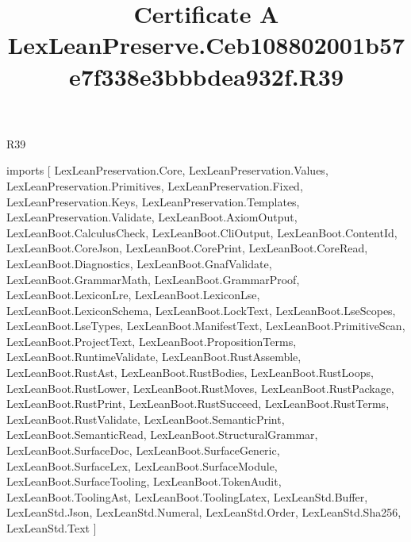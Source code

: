 \begin{lexlean}{R39}
\title{Certificate A LexLeanPreserve.Ceb108802001b57e7f338e3bbbdea932f.R39}
\begin{coremodule}
imports [
  LexLeanPreservation.Core,
  LexLeanPreservation.Values,
  LexLeanPreservation.Primitives,
  LexLeanPreservation.Fixed,
  LexLeanPreservation.Keys,
  LexLeanPreservation.Templates,
  LexLeanPreservation.Validate,
  LexLeanBoot.AxiomOutput,
  LexLeanBoot.CalculusCheck,
  LexLeanBoot.CliOutput,
  LexLeanBoot.ContentId,
  LexLeanBoot.CoreJson,
  LexLeanBoot.CorePrint,
  LexLeanBoot.CoreRead,
  LexLeanBoot.Diagnostics,
  LexLeanBoot.GnafValidate,
  LexLeanBoot.GrammarMath,
  LexLeanBoot.GrammarProof,
  LexLeanBoot.LexiconLre,
  LexLeanBoot.LexiconLse,
  LexLeanBoot.LexiconSchema,
  LexLeanBoot.LockText,
  LexLeanBoot.LseScopes,
  LexLeanBoot.LseTypes,
  LexLeanBoot.ManifestText,
  LexLeanBoot.PrimitiveScan,
  LexLeanBoot.ProjectText,
  LexLeanBoot.PropositionTerms,
  LexLeanBoot.RuntimeValidate,
  LexLeanBoot.RustAssemble,
  LexLeanBoot.RustAst,
  LexLeanBoot.RustBodies,
  LexLeanBoot.RustLoops,
  LexLeanBoot.RustLower,
  LexLeanBoot.RustMoves,
  LexLeanBoot.RustPackage,
  LexLeanBoot.RustPrint,
  LexLeanBoot.RustSucceed,
  LexLeanBoot.RustTerms,
  LexLeanBoot.RustValidate,
  LexLeanBoot.SemanticPrint,
  LexLeanBoot.SemanticRead,
  LexLeanBoot.StructuralGrammar,
  LexLeanBoot.SurfaceDoc,
  LexLeanBoot.SurfaceGeneric,
  LexLeanBoot.SurfaceLex,
  LexLeanBoot.SurfaceModule,
  LexLeanBoot.SurfaceTooling,
  LexLeanBoot.TokenAudit,
  LexLeanBoot.ToolingAst,
  LexLeanBoot.ToolingLatex,
  LexLeanStd.Buffer,
  LexLeanStd.Json,
  LexLeanStd.Numeral,
  LexLeanStd.Order,
  LexLeanStd.Sha256,
  LexLeanStd.Text
]


\end{coremodule}
\end{lexlean}
